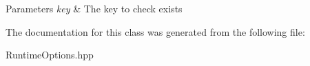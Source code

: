 \begin{DoxyParams}{Parameters}
{\em key} & The key to check exists \\
\hline
\end{DoxyParams}


The documentation for this class was generated from the following file\+:\begin{DoxyCompactItemize}
\item 
Runtime\+Options.\+hpp\end{DoxyCompactItemize}
